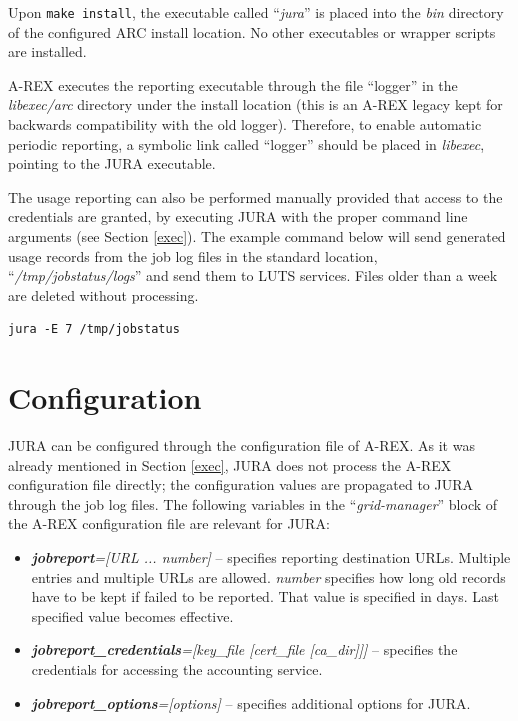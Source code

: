 \documentclass{article}                            %
\begin{document}
Upon \verb|make install|, the executable called ``\textit{jura}'' is
placed into the \textit{bin} directory of the configured ARC
install location. No other executables or wrapper scripts are
installed.

A-REX executes the reporting executable through the file ``logger'' in
the \textit{libexec/arc} directory under the install location (this is
an A-REX legacy kept for backwards compatibility with the old
logger). Therefore, to enable automatic periodic reporting, a symbolic
link called ``logger'' should be placed in \textit{libexec}, pointing
to the JURA executable.

The usage reporting can also be performed manually provided that
access to the credentials are granted, by executing JURA with the
proper command line arguments (see Section \ref{exec}). The example
command below will send generated usage records from the job log files
in the standard location, ``\textit{/tmp/jobstatus/logs}'' and send
them to LUTS services. Files older than a week are deleted without
processing.

\begin{verbatim}
jura -E 7 /tmp/jobstatus
\end{verbatim}

\section{Configuration}
\label{config}

JURA can be configured through the configuration file of
A-REX\cite{arex}. As it was already mentioned in Section \ref{exec},
JURA does not process the A-REX configuration file directly; the
configuration values are propagated to JURA through the job log
files. The following variables in the ``\textit{grid-manager}'' block
of the A-REX configuration file are relevant for JURA:

\begin{itemize}
\item \textbf{\textit{jobreport}}\textit{={[}URL ... number]} --
  specifies reporting destination URLs. Multiple entries and multiple
  URLs are allowed. \textit{number} specifies how long old records
  have to be kept if failed to be reported. That value is specified in
  days. Last specified value becomes effective.
\item \textbf{\textit{jobreport\_credentials}}\textit{={[}key\_file
    {[}cert\_file {[}ca\_dir]]]} -- specifies the credentials for
  accessing the accounting service.
\item \textbf{\textit{jobreport\_options}}\textit{={[}options]}
  -- specifies additional options for JURA.
\end{itemize}
\end{document}
